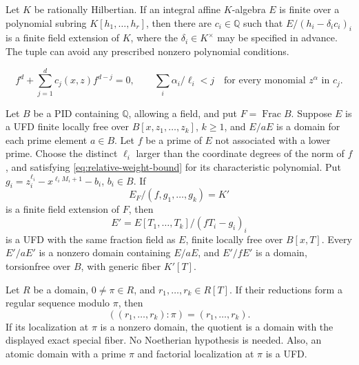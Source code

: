 \documentclass[10pt,a4paper]{amsart}
\begin{document}
\begin{lemma}\label{lem:relative-hit}
Let \(K\) be rationally Hilbertian.  If an integral affine
\(K\)-algebra \(E\) is finite over a polynomial subring
\(K[h_1,\ldots,h_r]\), then there are \(c_i\in\mathbb Q\) such that
\(E/(h_i-\delta_i c_i)_i\) is a finite field extension of \(K\),
where the \(\delta_i\in K^\times\) may be specified in advance.
The tuple can avoid any prescribed nonzero polynomial conditions.
\end{lemma}

\begin{equation}\label{eq:relative-weight-bound}
f^d+\sum_{j=1}^d c_j(x,z)f^{d-j}=0,
 \qquad
 \sum_i\alpha_i/\ell_i<j
 \quad\text{for every monomial }z^\alpha\text{ in }c_j.
\end{equation}

\begin{lemma}\label{lem:relative-horizontal}
Let \(B\) be a PID containing \(\mathbb Q\), allowing a field,
and put \(F=\operatorname{Frac}B\).  Suppose \(E\) is a UFD
finite locally free over \(B[x,z_1,\ldots,z_k]\), \(k\ge1\),
and \(E/aE\) is a domain for each prime element \(a\in B\).
Let \(f\) be a prime of \(E\) not associated with a lower prime.
Choose the distinct \(\ell_i\) larger than the coordinate degrees
of the norm of \(f\), and satisfying
\eqref{eq:relative-weight-bound} for its characteristic polynomial.
Put \(g_i=z_i^{\ell_i}-x^{\ell_iM_i+1}-b_i\), \(b_i\in B\).
If
\[
 E_F/(f,g_1,\ldots,g_k)=K'
\]
is a finite field extension of \(F\), then
\[
 E'=E[T_1,\ldots,T_k]/(fT_i-g_i)_i
\]
is a UFD with the same fraction field as \(E\), finite locally
free over \(B[x,T]\).  Every \(E'/aE'\) is a nonzero domain
containing \(E/aE\), and \(E'/fE'\) is a domain, torsionfree
over \(B\), with generic fiber \(K'[T]\).
\end{lemma}

\begin{lemma}\label{lem:relative-saturation}
Let \(R\) be a domain, \(0\ne\pi\in R\), and
\(r_1,\ldots,r_k\in R[T]\).  If their reductions form a
regular sequence modulo \(\pi\), then
\[
 ((r_1,\ldots,r_k):\pi)=(r_1,\ldots,r_k).
\]
If its localization at \(\pi\) is a nonzero domain, the quotient
is a domain with the displayed exact special fiber.  No
Noetherian hypothesis is needed.  Also, an atomic domain with a
prime \(\pi\) and factorial localization at \(\pi\) is a UFD.
\end{lemma}
\end{document}
